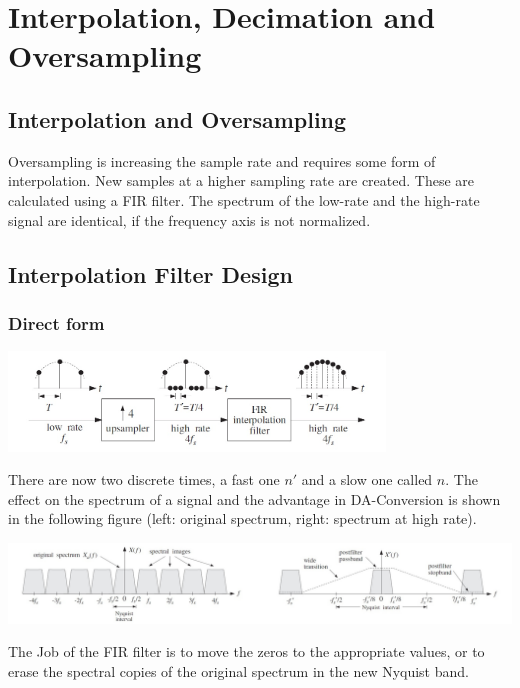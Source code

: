 \section{Interpolation, Decimation and Oversampling}
\subsection{Interpolation and Oversampling}
Oversampling is increasing the sample rate and requires some form of interpolation. New samples at a higher sampling rate are created. These are calculated using a FIR filter. The spectrum of the low-rate and the high-rate signal are identical, if the frequency axis is not normalized.

\subsection{Interpolation Filter Design}
\subsubsection{Direct form}

\begin{center}
	\includegraphics[width=10cm]{images/IntDecOv_IncSamplingRate.jpg}
\end{center}

There are now two discrete times, a fast one $n'$ and a slow one called $n$.
The effect on the spectrum of a signal and the advantage in DA-Conversion is
shown in the following figure (left: original spectrum, right: spectrum
at high rate).

\begin{center}
	\includegraphics[width=16cm]{images/IntDecOv_Spectrum.jpg}
\end{center}

The Job of the FIR filter is to move the zeros to the appropriate values,
or to erase the spectral copies of the original spectrum in the new
Nyquist band. \\

